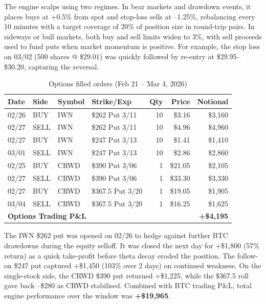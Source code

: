 \documentclass[11pt,letterpaper]{article}
\begin{document}
The engine scalps using two regimes. In bear markets and drawdown events, it
places buys at +0.5\% from spot and stop-loss sells at --1.25\%, rebalancing
every 10 minutes with a target coverage of 20\% of position size in round-trip
pairs. In sideways or bull markets, both buy and sell limits widen to 3\%,
with sell proceeds used to fund puts when market momentum is positive.
For example, the stop loss on 03/02 (500 shares @ \$29.01) was quickly
followed by re-entry at \$29.95--\$30.20, capturing the reversal.

\begin{table}[H]
\centering
\caption{Options filled orders (Feb 21 -- Mar 4, 2026)}
{\small
\begin{tabular*}{\textwidth}{@{\extracolsep{\fill}}lll l r r r}
\toprule
Date & Side & Symbol & Strike/Exp & Qty & Price & Notional \\
\midrule
02/26 & BUY  & IWN  & \$262 Put 3/11   & 10 & \$3.16  & \$3,160 \\
02/27 & SELL & IWN  & \$262 Put 3/11   & 10 & \$4.96  & \$4,960 \\
02/27 & BUY  & IWN  & \$247 Put 3/13   & 10 & \$1.41  & \$1,410 \\
03/01 & SELL & IWN  & \$247 Put 3/13   & 10 & \$2.86  & \$2,860 \\
02/25 & BUY  & CRWD & \$390 Put 3/06   &  1 & \$21.05 & \$2,105 \\
02/27 & SELL & CRWD & \$390 Put 3/06   &  1 & \$33.30 & \$3,330 \\
02/27 & BUY  & CRWD & \$367.5 Put 3/20 &  1 & \$19.05 & \$1,905 \\
03/04 & SELL & CRWD & \$367.5 Put 3/20 &  1 & \$16.25 & \$1,625 \\
\midrule
\multicolumn{5}{l}{\textbf{Options Trading P\&L}} & \multicolumn{2}{r}{\textcolor{gain}{\textbf{+\$4,195}}} \\
\bottomrule
\end{tabular*}}
\end{table}

\noindent
The IWN \$262 put was opened on 02/26 to hedge against further BTC drawdowns
during the equity selloff. It was closed the next day for
\textcolor{gain}{+\$1,800} (57\% return) as a quick take-profit before theta
decay eroded the position. The follow-on \$247 put captured
\textcolor{gain}{+\$1,450} (103\% over 2 days) on continued weakness. On the
single-stock side, the CRWD \$390 put returned
\textcolor{gain}{+\$1,225}, while the \$367.5 roll gave back
\textcolor{loss}{--\$280} as CRWD stabilised. Combined with BTC trading
P\&L, total engine performance over the window was
\textcolor{gain}{\textbf{+\$19,965}}.
\end{document}
